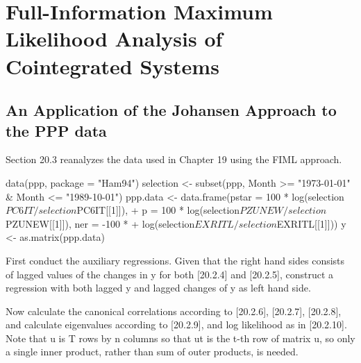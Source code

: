 \documentclass[a4paper]{article}
\renewcommand{\~}{\perispomeni}%
\begin{document}
\section{Full-Information Maximum Likelihood Analysis of Cointegrated Systems}
\subsection{An Application of the Johansen Approach to the PPP data}
Section 20.3 reanalyzes the data used in Chapter 19 using the FIML approach. 
\begin{Schunk}
\begin{Sinput}
 data(ppp, package = "Ham94")
 selection <- subset(ppp, Month >= "1973-01-01" & Month <= "1989-10-01")
 ppp.data <- data.frame(pstar = 100 * log(selection$PC6IT/selection$PC6IT[[1]]), 
+     p = 100 * log(selection$PZUNEW/selection$PZUNEW[[1]]), ner = -100 * 
+         log(selection$EXRITL/selection$EXRITL[[1]]))
 y <- as.matrix(ppp.data)
\end{Sinput}
\end{Schunk}
First conduct the auxiliary regressions.  Given that the right hand sides consists of lagged values of the changes in y
for both [20.2.4] and [20.2.5], construct a regression with both lagged y and lagged changes of y as left hand side.
\begin{Schunk}
\end{Schunk}
Now calculate the canonical correlations according to [20.2.6], [20.2.7], [20.2.8],
and calculate eigenvalues according to [20.2.9], and log likelihood as in [20.2.10].
Note that u is T rows by n columns
so that ut is the t-th row of matrix u, so only a single inner product, rather than sum of outer products, is needed.
\end{document}
